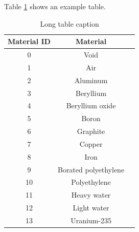 Table \ref{tab:bg:mats} shows an example table.

\begin{table}[h]
  \centering
  \caption[Short table caption]{Long table caption}
  \label{tab:bg:mats}
  \begin{tabular}{| c | c | c |}
    \hline
    \textbf{Material ID} & \textbf{Material} \\ \hline
     0 & Void                 \\ \hline
     1 & Air                  \\ \hline
     2 & Aluminum             \\ \hline
     3 & Beryllium            \\ \hline
     4 & Beryllium oxide      \\ \hline
     5 & Boron                \\ \hline
     6 & Graphite             \\ \hline
     7 & Copper               \\ \hline
     8 & Iron                 \\ \hline
     9 & Borated polyethylene \\ \hline
    10 & Polyethylene         \\ \hline
    11 & Heavy water          \\ \hline
    12 & Light water          \\ \hline
    13 & Uranium-235          \\ \hline
  \end{tabular}
\end{table}
